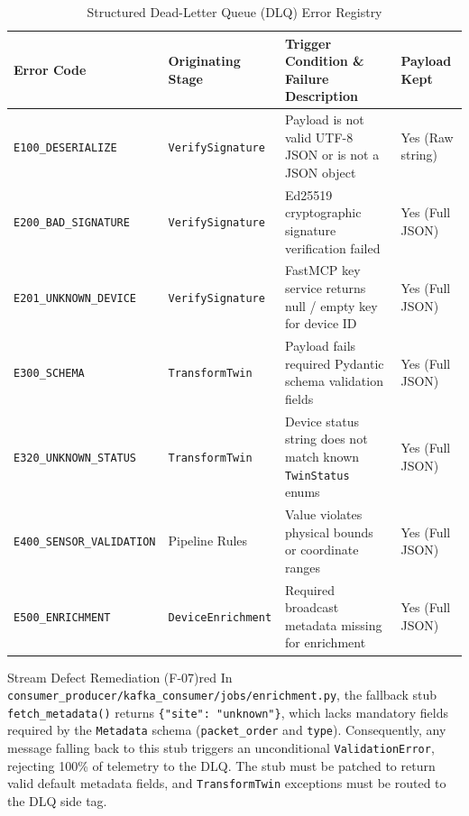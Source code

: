 \documentclass[10pt,a4paper]{report}
\begin{document}
\begin{table}[htbp]
\centering
\small
\caption{Structured Dead-Letter Queue (DLQ) Error Registry}
\label{tab:dlq_errors}
\begin{tabularx}{\textwidth}{llXl}
\toprule
\textbf{Error Code} & \textbf{Originating Stage} & \textbf{Trigger Condition \& Failure Description} & \textbf{Payload Kept} \\
\midrule
\texttt{E100\_DESERIALIZE} & \texttt{VerifySignature} & Payload is not valid UTF-8 JSON or is not a JSON object & Yes (Raw string) \\
\texttt{E200\_BAD\_SIGNATURE} & \texttt{VerifySignature} & Ed25519 cryptographic signature verification failed & Yes (Full JSON) \\
\texttt{E201\_UNKNOWN\_DEVICE} & \texttt{VerifySignature} & FastMCP key service returns null / empty key for device ID & Yes (Full JSON) \\
\texttt{E300\_SCHEMA} & \texttt{TransformTwin} & Payload fails required Pydantic schema validation fields & Yes (Full JSON) \\
\texttt{E320\_UNKNOWN\_STATUS} & \texttt{TransformTwin} & Device status string does not match known \texttt{TwinStatus} enums & Yes (Full JSON) \\
\texttt{E400\_SENSOR\_VALIDATION} & Pipeline Rules & Value violates physical bounds or coordinate ranges & Yes (Full JSON) \\
\texttt{E500\_ENRICHMENT} & \texttt{DeviceEnrichment} & Required broadcast metadata missing for enrichment & Yes (Full JSON) \\
\bottomrule
\end{tabularx}
\end{table}

\begin{callout}{Stream Defect Remediation (F-07)}{red}
In \texttt{consumer\_producer/kafka\_consumer/jobs/enrichment.py}, the fallback stub \lstinline|fetch_metadata()| returns \lstinline|{"site": "unknown"}|, which lacks mandatory fields required by the \texttt{Metadata} schema (\texttt{packet\_order} and \texttt{type}). Consequently, any message falling back to this stub triggers an unconditional \texttt{ValidationError}, rejecting 100\% of telemetry to the DLQ. The stub must be patched to return valid default metadata fields, and \texttt{TransformTwin} exceptions must be routed to the DLQ side tag.
\end{callout}
\end{document}

